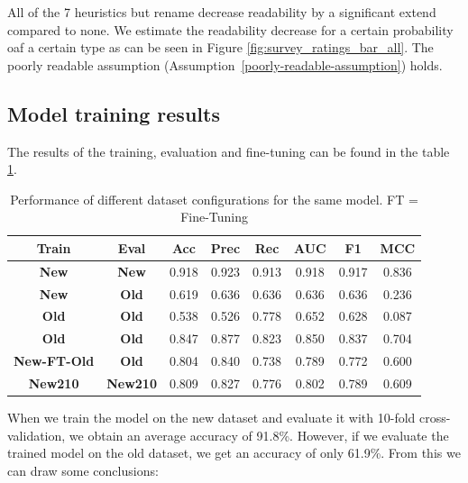 \documentclass[%
class=scrreprt,
chapterprefix=false,%
open=right,%
twoside=false,%
paper=a4,%
logofile={Logo\_zentral\_farbig\_EN.png},%
thesistype=master,%
UKenglish,%
]{se2thesis}
\theoremstyle{definition}
\newenvironment{researchbox}[1]{\begin{tcolorbox}[colback=blue!10!white,colframe=blue!50!black,title=#1]}{\end{tcolorbox}}
\begin{document}
	\begin{researchbox}{Summary (RQ2 - generate-poor):}
		All of the 7 heuristics but rename decrease readability by a significant extend compared to none. We estimate the readability decrease for a certain probability oaf a certain type as can be seen in Figure \ref{fig:survey_ratings_bar_all}. The poorly readable assumption (Assumption~\ref{poorly-readable-assumption}) holds. 
	\end{researchbox}

\subsection{Model training results} \label{Model training results}
	The results of the training, evaluation and fine-tuning can be found in the table \ref{tab:dataset_performance}.
	
	\begin{table}[h]
		\centering
		\begin{tabular}{|c|c|c|c|c|c|c|c|}
			\hline
			\textbf{Train} & \textbf{Eval} & \textbf{Acc} & \textbf{Prec} & \textbf{Rec} & \textbf{AUC} & \textbf{F1} & \textbf{MCC} \\
			\hline
			\textbf{New} 		& \textbf{New} 	& 0.918 & 0.923 & 0.913 & 0.918 & 0.917 & 0.836 \\
			\textbf{New} 		& \textbf{Old}  	& 0.619 & 0.636 & 0.636 & 0.636 & 0.636 & 0.236 \\
			\textbf{Old} 		& \textbf{Old} 	& 0.538 & 0.526 & 0.778 & 0.652 & 0.628 & 0.087 \\
			\textbf{Old}  		& \textbf{Old}  	& 0.847 & 0.877 & 0.823 & 0.850 & 0.837 & 0.704 \\
			
			\textbf{New-FT-Old}& \textbf{Old}  	& 0.804 & 0.840 & 0.738 & 0.789 & 0.772 & 0.600 \\
			\textbf{New210}  	& \textbf{New210}  & 0.809 & 0.827 & 0.776 & 0.802 & 0.789 & 0.609 \\
			\hline
		\end{tabular}
		\caption{Performance of different dataset configurations for the same model. FT = Fine-Tuning}
		\label{tab:dataset_performance}
	\end{table}
		
	When we train the model on the new dataset and evaluate it with 10-fold cross-validation, we obtain an average accuracy of 91.8\%. However, if we evaluate the trained model on the old dataset, we get an accuracy of only 61.9\%. From this we can draw some conclusions:
	
\end{document}

